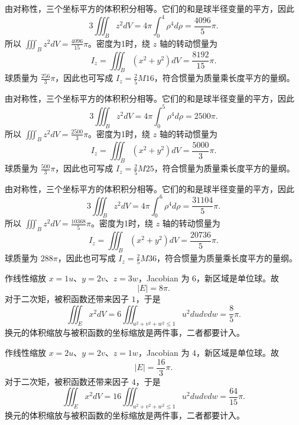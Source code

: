\documentclass[12pt,fontset=fandol]{ctexart}
\begin{document}
\begin{solve}\label{ans:c39q10}
由对称性，三个坐标平方的体积积分相等。它们的和是球半径变量的平方，因此
\[
3\iiint_Bz^2dV=4\pi\int_0^{4}\rho^4d\rho=\frac{4096}{5}\pi.
\]
所以 $\iiint_Bz^2dV=\frac{4096}{15}\pi$。密度为1时，绕 $z$ 轴的转动惯量为
\[
I_z=\iiint_B(x^2+y^2)dV=\frac{8192}{15}\pi.
\]
球质量为 $\frac{256}{3}\pi$，因此也可写成 $I_z=\frac25M16$，符合惯量为质量乘长度平方的量纲。
\end{solve}

\begin{solve}\label{ans:c39q11}
由对称性，三个坐标平方的体积积分相等。它们的和是球半径变量的平方，因此
\[
3\iiint_Bz^2dV=4\pi\int_0^{5}\rho^4d\rho=2500\pi.
\]
所以 $\iiint_Bz^2dV=\frac{2500}{3}\pi$。密度为1时，绕 $z$ 轴的转动惯量为
\[
I_z=\iiint_B(x^2+y^2)dV=\frac{5000}{3}\pi.
\]
球质量为 $\frac{500}{3}\pi$，因此也可写成 $I_z=\frac25M25$，符合惯量为质量乘长度平方的量纲。
\end{solve}

\begin{solve}\label{ans:c39q12}
由对称性，三个坐标平方的体积积分相等。它们的和是球半径变量的平方，因此
\[
3\iiint_Bz^2dV=4\pi\int_0^{6}\rho^4d\rho=\frac{31104}{5}\pi.
\]
所以 $\iiint_Bz^2dV=\frac{10368}{5}\pi$。密度为1时，绕 $z$ 轴的转动惯量为
\[
I_z=\iiint_B(x^2+y^2)dV=\frac{20736}{5}\pi.
\]
球质量为 $288\pi$，因此也可写成 $I_z=\frac25M36$，符合惯量为质量乘长度平方的量纲。
\end{solve}

\begin{solve}\label{ans:c39q13}
作线性缩放 $x=1u$、$y=2v$、$z=3w$，Jacobian 为 $6$，新区域是单位球。故
\[
|E|=8\pi.
\]
对于二次矩，被积函数还带来因子 $1$，于是
\[
\iiint_Ex^2dV=6\iiint_{u^2+v^2+w^2\le1}u^2dudvdw=\frac{8}{5}\pi.
\]
换元的体积缩放与被积函数的坐标缩放是两件事，二者都要计入。
\end{solve}

\begin{solve}\label{ans:c39q14}
作线性缩放 $x=2u$、$y=2v$、$z=1w$，Jacobian 为 $4$，新区域是单位球。故
\[
|E|=\frac{16}{3}\pi.
\]
对于二次矩，被积函数还带来因子 $4$，于是
\[
\iiint_Ex^2dV=16\iiint_{u^2+v^2+w^2\le1}u^2dudvdw=\frac{64}{15}\pi.
\]
换元的体积缩放与被积函数的坐标缩放是两件事，二者都要计入。
\end{solve}
\end{document}
